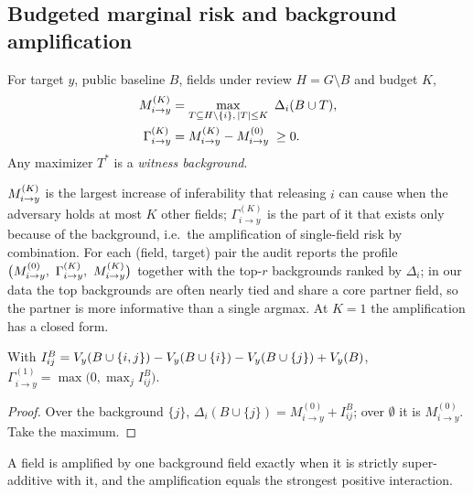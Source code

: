 \subsection{Budgeted marginal risk and background amplification}
\begin{definition}\label{def:mk}
For target $y$, public baseline $B$, fields under review $H=G\setminus B$ and budget $K$,
\begin{align}
\Mik &= \max_{T \subseteq H \setminus \{i\},\, |T| \le K}\ \Delta_i(B\cup T), \label{eq:mk}\\
\Gamma^{(K)}_{i\to y} &= \Mik - M^{(0)}_{i\to y} \;\ge 0 . \label{eq:gamma}
\end{align}
Any maximizer $T^{*}$ is a \emph{witness background}.
\end{definition}
$M^{(K)}_{i \to y}$ is the largest increase of inferability that releasing $i$ can cause when the adversary
holds at most $K$ other fields; $\Gamma^{(K)}_{i\to y}$ is the part of it that exists only because of
the background, i.e.\ the amplification of single-field risk by combination. For each (field,
target) pair the audit reports the profile $\big(M^{(0)}_{i\to y},\ \Gamma^{(K)}_{i\to y},\ \Mik\big)$
together with the top-$r$ backgrounds ranked by $\Delta_i$; in our data the top backgrounds are
often nearly tied and share a core partner field, so the partner is more informative than a
single argmax. At $K=1$ the amplification has a closed form.

\begin{proposition}[Amplification at $K=1$]\label{prop:k1}
With $I^B_{ij}=V_{y}(B\cup\{i,j\})-V_{y}(B\cup\{i\})-V_{y}(B\cup\{j\})+V_{y}(B)$,
$\Gamma^{(1)}_{i\to y}=\max\big(0,\max_{j} I^{B}_{ij}\big)$.
\end{proposition}
\begin{proof}
Over the background $\{j\}$, $\Delta_i(B\cup\{j\})=M^{(0)}_{i\to y}+I^B_{ij}$; over $\emptyset$ it is
$M^{(0)}_{i\to y}$. Take the maximum.
\end{proof}
A field is amplified by one background field exactly when it is strictly super-additive with it,
and the amplification equals the strongest positive interaction.


